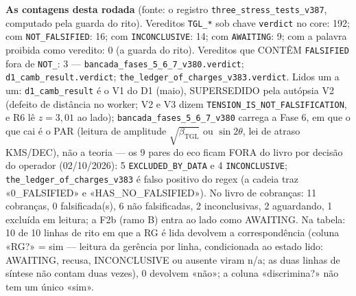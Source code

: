 \documentclass[11pt]{article}
\newcommand{\bTGL}{\beta_{\mathrm{TGL}}}\newcommand{\Msun}{M_{\odot}}\newcommand{\TGL}{\mathrm{TGL}}
\theoremstyle{definition}\newtheorem{deriv}{Derivação}
\begin{document}
\textbf{As contagens desta rodada} (fonte: o registro \texttt{three\_stress\_tests\_v387}, computado pela guarda do rito). Vereditos \texttt{TGL\_*} sob chave \texttt{verdict} no core: 192; com \texttt{NOT\_FALSIFIED}: 16; com \texttt{INCONCLUSIVE}: 14; com \texttt{AWAITING}: 9; com a palavra proibida como veredito: 0 (a guarda do rito). Vereditos que CONTÊM \texttt{FALSIFIED} fora de \texttt{NOT\_}: 3 --- \texttt{bancada\_fases\_5\_6\_7\_v380.verdict}; \texttt{d1\_camb\_result.verdict}; \texttt{the\_ledger\_of\_charges\_v383.verdict}. Lidos um a um: \texttt{d1\_camb\_result} é o V1 do D1 (maio), SUPERSEDIDO pela autópsia V2 (defeito de distância no worker; V2 e V3 dizem \texttt{TENSION\_IS\_NOT\_FALSIFICATION}, e R6 lê $z=3{,}01$ ao lado); \texttt{bancada\_fases\_5\_6\_7\_v380} carrega a Fase 6, em que o que cai é o PAR (leitura de amplitude $\sqrt{\bTGL}$ ou $\sin2\theta$, lei de atraso KMS/DEC), não a teoria --- os 9 pares do eco ficam FORA do livro por decisão do operador (02/10/2026): 5 \texttt{EXCLUDED\_BY\_DATA} e 4 \texttt{INCONCLUSIVE}; \texttt{the\_ledger\_of\_charges\_v383} é falso positivo do regex (a cadeia traz «0\_FALSIFIED» e «HAS\_NO\_FALSIFIED»). No livro de cobranças: 11 cobranças, 0 falsificada(s), 6 não falsificadas, 2 inconclusivas, 2 aguardando, 1 excluída em leitura; a F2b (ramo B) entra ao lado como AWAITING. Na tabela: 10 de 10 linhas de rito em que a RG é lida devolvem a correspondência (coluna «RG?» = sim --- leitura da gerência por linha, condicionada ao estado lido: AWAITING, recusa, INCONCLUSIVE ou ausente viram n/a; as duas linhas de síntese não contam duas vezes), 0 devolvem «não»; a coluna «discrimina?» não tem um único «sim».
\end{document}
